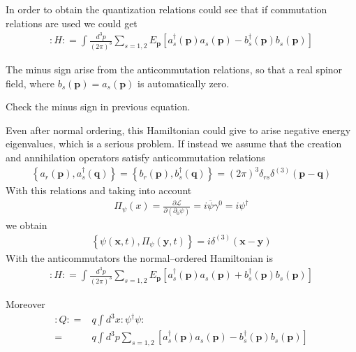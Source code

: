 \begin{frame}
In order to obtain the quantization relations could see that if commutation relations are used we could get
\begin{align}
  \colon\!H\colon=\int\frac{d^3p}{(2\pi)^3}\sum_{s=1,2}E_{\mathbf{p}}\left[a^\dagger_s(\mathbf{p})a_s(\mathbf{p})-b^\dagger_s(\mathbf{p})b_s(\mathbf{p})\right]
\end{align}
\end{frame}
The minus sign arise from the anticommutation relations, so that a real spinor field, where $b_s(\mathbf{p})=a_s(\mathbf{p})$ is automatically zero.
\begin{inprogress}
  Check the minus sign in previous equation.
\end{inprogress}
\begin{frame}
Even after normal ordering, this Hamiltonian could give to arise negative energy eigenvalues, which is a serious problem. If instead we assume that the creation and annihilation operators satisfy anticommutation relations
\begin{align}
  \left\{a_r(\mathbf{p}),a_s^\dagger(\mathbf{q})\right\}=\left\{b_r(\mathbf{p}),b_s^\dagger(\mathbf{q})\right\}=(2\pi)^3\delta_{r s}\delta^{(3)}(\mathbf{p}-\mathbf{q})
\end{align}
With this relations and taking into account
\begin{align}
  \Pi_\psi(x)=\frac{\partial\mathcal{L}}{\partial(\partial_0\psi)}=i\overline{\psi}\gamma^0=i \psi^\dagger 
\end{align}
we obtain
\begin{align}
  \left\{\psi(\mathbf{x},t),\Pi_\psi(\mathbf{y},t)\right\}=i \delta^{(3)}(\mathbf{x}-\mathbf{y}) 
\end{align}
With the anticommutators the normal--ordered Hamiltonian is
\begin{align}
    \colon\!H\colon=\int\frac{d^3p}{(2\pi)^3}\sum_{s=1,2}E_{\mathbf{p}}\left[a^\dagger_s(\mathbf{p})a_s(\mathbf{p})+b^\dagger_s(\mathbf{p})b_s(\mathbf{p})\right]
\end{align}
\end{frame}
Moreover
\begin{align}
    \colon\!Q\colon=&q\int d^3x \colon\!\psi^\dagger\psi\colon\nonumber\\
    =&   q \int d^3p\sum_{s=1,2}\left[a^\dagger_s(\mathbf{p})a_s(\mathbf{p})-b^\dagger_s(\mathbf{p})b_s(\mathbf{p})\right]
\end{align}
